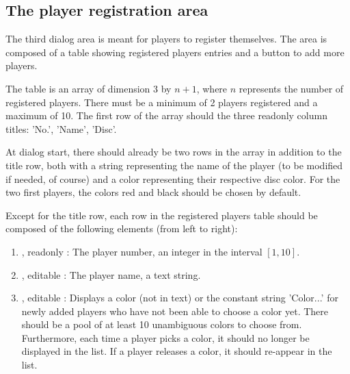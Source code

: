   \subsection{The player registration area} \label{dlg:PlayerReg}
  The third dialog area is meant for players to register themselves. The area is
  composed of a table showing registered players entries and a button to add
  more players.

  The table is an array of dimension 3 by $n + 1$, where $n$ represents
  the number of registered players. There must be a minimum of 2 players
  registered and a maximum of 10. The first row of the array should the
  three readonly column titles: 'No.', 'Name', 'Disc'.

  At dialog start, there should already be two rows in the array in addition to
  the title row, both with a string representing the name of the player
  (to be modified if needed, of course) and a color representing their
  respective disc color. For the two first players, the colors red and black
  should be chosen by default.

  Except for the title row, each row in the registered players table should
  be composed of the following elements (from left to right):

  \begin{enumerate}
    \item {},     readonly : The player number, an integer in the
                                           interval $[1, 10]$.
    \item {},     editable : The player name, a text string.
    \item {}, editable : Displays a color (not in text) or
                                           the constant string 'Color...' for
                                           newly added players who have not been
                                           able to choose a color yet. There
                                           should be a pool of at least 10
                                           unambiguous colors to choose from.
                                           Furthermore, each time a player
                                           picks a color, it should no longer
                                           be displayed in the list. If a
                                           player releases a color, it should
                                           re-appear in the list.
  \end{enumerate}

